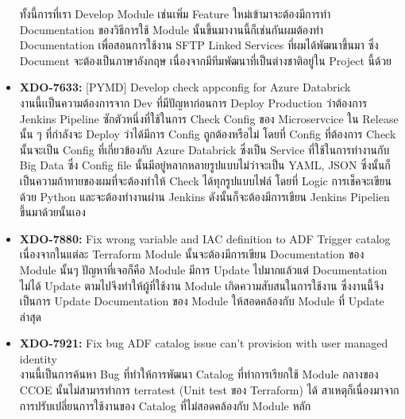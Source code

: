 \begin{itemize}
            ทั้งนี้การที่เรา Develop Module เช่นเพิ่ม Feature ใหม่เข้ามาจะต้องมีการทำ Documentation ของวิธีการใช้ Module นั้นขึ้นมางานนี้ก็เช่นกันผมต้องทำ Documentation เพื่อสอนการใช้งาน SFTP Linked Services ที่ผมได้พัฒนาขึ้นมา ซึ่ง Document จะต้องเป็นภาษาอังกฤษ เนื่องจากมีทีมพัฒนาที่เป็นต่างชาติอยู่ใน Project นี้ด้วย
      \item \textbf{XDO-7633:} [PYMD] Develop check appconfig for Azure Databrick\\
            งานนี้เเป็นความต้องการจาก Dev ที่มีปัญหาก่อนการ Deploy Production ว่าต้องการ Jenkins Pipeline ซักตัวหนึ่งที่ใช้ในการ Check Config ของ Microservcice ใน Release นั้น ๆ ที่กำลังจะ Deploy ว่าได้มีการ Config ถูกต้องหรือไม่ โดยที่ Config ที่ต้องการ Check นั้นจะเป็น Config ที่เกี่ยวข้องกับ Azure Databrick ซึ่งเป็น Service ที่ใช้ในการทำงานกับ Big Data ซึ่ง Config file นั้นมีอยู๋หลากหลายรูปแบบไม่ว่าจะเป็น YAML, JSON ซึ่งนั้นก็เป็นความถ้าทายของผมที่จะต้องทำให้ Check ได้ทุกรูปแบบไฟล์ โดยที่ Logic การเช็คจะเขียนด้วย Python และจะต้องทำงานผ่าน Jenkins ดังนั้นก็จะต้องมีการเขียน Jenkins Pipelien ขึ้นมาด้วยนั้นเอง
      \item \textbf{XDO-7880:} Fix wrong variable and IAC definition to ADF Trigger catalog\\
            เนื่องจากในแต่ละ Terraform Module นั้นจะต้องมีการเขียน Documentation ของ Module นั้นๆ ปัญหาที่เจอก็คือ Module มีการ Update ไปมากแล้วแต่ Documentation ไม่ได้ Update ตามไปจึงทำให้ผู้ที่ใช้งาน Module เกิดความสับสนในการใช้งาน ซึ่งงานนี้จึงเป็นการ Update Documentation ของ Module ให้สอดคล้องกับ Module ที่ Update ล่าสุด
      \item \textbf{XDO-7921:} Fix bug ADF catalog issue can't provision with user managed identity\\
            งานนี้เป็นการค้นหา Bug ที่ทำให้การพัฒนา Catalog ที่ทำการเรียกใช้ Module กลางของ CCOE นั้นไม่สามารทำการ terratest (Unit test ของ Terraform) ได้ สาเหตุก็เนื่องมาจากการปรับเปลี่ยนการใช้งานของ Catalog ที่ไม่สอดคล้องกับ Module หลัก
\end{itemize}

